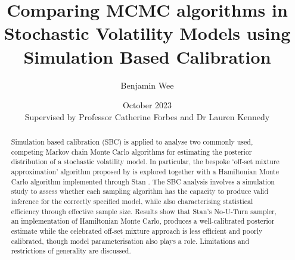 \documentclass[12pt, a4paper]{article}
\title{Comparing MCMC algorithms in Stochastic Volatility Models using Simulation Based Calibration}
\author{Benjamin Wee}
\date{\small October 2023\\[0.5cm]{\small Supervised by Professor Catherine Forbes and Dr Lauren Kennedy}}
\begin{document}
\maketitle 

\begin{abstract}
    Simulation based calibration (SBC) \citep{talts2020validating} is applied to analyse two commonly used, competing Markov chain Monte Carlo algorithms for estimating the posterior distribution of a stochastic volatility model. In particular, the bespoke ‘off-set mixture approximation’ algorithm proposed by \citet{kim1998stochastic} is explored together with a Hamiltonian Monte Carlo algorithm implemented through Stan \citep{stan}. The SBC analysis involves a simulation study to assess whether each sampling algorithm has the capacity to produce valid inference for the correctly specified model, while also characterising statistical efficiency through effective sample size. Results show that Stan's No-U-Turn sampler, an implementation of Hamiltonian Monte Carlo, produces a well-calibrated posterior estimate while the celebrated off-set mixture approach is less efficient and poorly calibrated, though model parameterisation also plays a role. Limitations and restrictions of generality are discussed.
    
    

\end{abstract}
\end{document}
